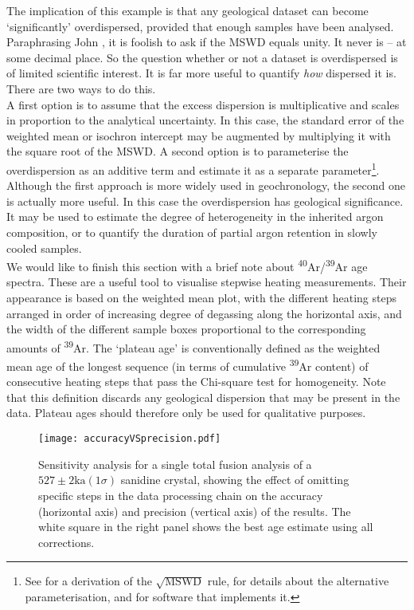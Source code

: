 \documentclass{article}
\begin{document}
The implication of this example is that any geological dataset can
become `significantly' overdispersed, provided that enough samples
have been analysed.  Paraphrasing John \citet{tukey1991}, it is
foolish to ask if the MSWD equals unity. It never is -- at some
decimal place.  So the question whether or not a dataset is
overdispersed is of limited scientific interest.  It is far more
useful to quantify \emph{how} dispersed it is. There are two ways to
do this.\\

A first option is to assume that the excess dispersion is
multiplicative and scales in proportion to the analytical
uncertainty. In this case, the standard error of the weighted mean or
isochron intercept may be augmented by multiplying it with the square
root of the MSWD.  A second option is to parameterise the
overdispersion as an additive term and estimate it as a separate
parameter\footnote{See \citet{vermeesch2018c} for a derivation of the
  $\sqrt{\mathrm{MSWD}}$ rule, for details about the alternative
  parameterisation, and for software that implements it.}. Although
the first approach is more widely used in geochronology, the second
one is actually more useful. In this case the overdispersion has
geological significance. It may be used to estimate the degree of
heterogeneity in the inherited argon composition, or to quantify the
duration of partial argon retention in slowly cooled samples.\\

We would like to finish this section with a brief note about
\textsuperscript{40}Ar/\textsuperscript{39}Ar age spectra. These are a
useful tool to visualise stepwise heating measurements. Their
appearance is based on the weighted mean plot, with the different
heating steps arranged in order of increasing degree of degassing
along the horizontal axis, and the width of the different sample boxes
proportional to the corresponding amounts of \textsuperscript{39}Ar.
The `plateau age' is conventionally defined as the weighted mean age
of the longest sequence (in terms of cumulative \textsuperscript{39}Ar
content) of consecutive heating steps that pass the Chi-square test
for homogeneity. Note that this definition discards any geological
dispersion that may be present in the data.  Plateau ages should
therefore only be used for qualitative purposes.

\clearpage

\begin{figure}
  \texttt{[image: accuracyVSprecision.pdf]}
  \caption{Sensitivity analysis for a single total fusion analysis of
    a $527 \pm 2 \mathrm{ka} (1\sigma)$ sanidine crystal, showing the
    effect of omitting specific steps in the data processing chain on
    the accuracy (horizontal axis) and precision (vertical axis) of
    the results. The white square in the right panel shows the best
    age estimate using all corrections.}
  \label{fig:accuracyVSprecision}
\end{figure}
\end{document}
